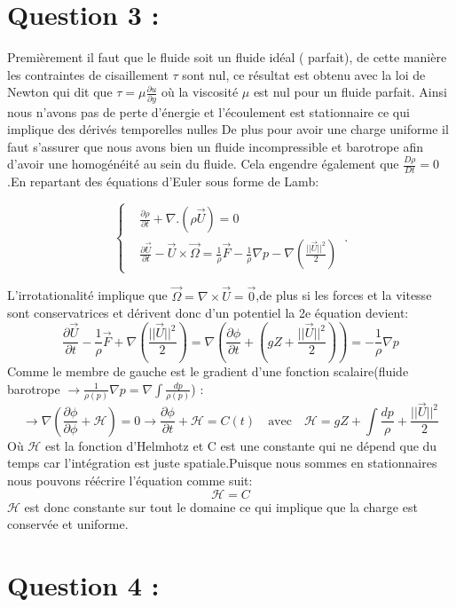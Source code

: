 \documentclass{article}
\begin{document}
\section*{Question 3 :}
Premièrement il faut que le fluide soit un fluide idéal ( parfait), de cette manière les contraintes de cisaillement $\tau$ sont nul, ce résultat est obtenu avec la loi de Newton qui dit que $\tau=\mu \frac{\partial u}{\partial y}$ où la viscosité $\mu$ est nul pour un fluide parfait. Ainsi nous n'avons pas de perte d'énergie et l'écoulement est stationnaire ce qui implique des dérivés temporelles nulles
De plus pour avoir une charge uniforme il faut s'assurer que nous avons bien un fluide incompressible et barotrope afin d'avoir une homogénéité au sein du fluide. Cela engendre également que $\frac{D\rho}{Dt}=0$.En repartant des équations d'Euler sous forme de Lamb:

\begin{equation}
    \begin{cases}
       &\frac{\partial \rho}{\partial t}+\nabla.(\rho \vec{U})=0\\
       &\frac{\partial \Vec{U}}{\partial t} -\vec{U}\times\vec{\Omega}=\frac{1}{\rho}\vec{F}-\frac{1}{\rho}\nabla p-\nabla(\frac{||\vec{U}||^2}{2})
    \end{cases}\,.
\end{equation}

L'irrotationalité implique que $\vec{\Omega}=\nabla \times \vec{U}=\vec{0}$,de plus si les forces et la vitesse sont conservatrices et dérivent donc d'un potentiel la 2e équation devient:
$$\frac{\partial \Vec{U}}{\partial t} -\frac{1}{\rho}\vec{F}+\nabla(\frac{||\vec{U}||^2}{2})=\nabla(\frac{\partial \phi}{\partial t}+(gZ+\frac{||\vec{U}||^2}{2}))=-\frac{1}{\rho}\nabla p$$
Comme le membre de gauche est le gradient d'une fonction scalaire(fluide barotrope $\rightarrow \frac{1}{\rho(p)}\nabla p=\nabla \int \frac{dp}{\rho(p)}$) :
$$\rightarrow \nabla(\frac{\partial \phi}{\partial \phi}+\mathcal{H})=0 \rightarrow  \frac{\partial \phi}{\partial t}+\mathcal{H}=C(t) \quad\text{avec} \quad\mathcal{H}=gZ +\int \frac{dp}{\rho}+\frac{||\vec{U}||^2}{2}$$
Où $\mathcal{H}$ est la fonction d'Helmhotz et C est une constante qui ne dépend que du temps car l'intégration est juste spatiale.Puisque nous sommes en stationnaires nous pouvons réécrire l'équation comme suit:
$$\mathcal{H}=C$$
$\mathcal{H}$ est donc constante sur tout le domaine ce qui implique que la charge est conservée et uniforme.
\section*{Question 4 :}
\end{document}

